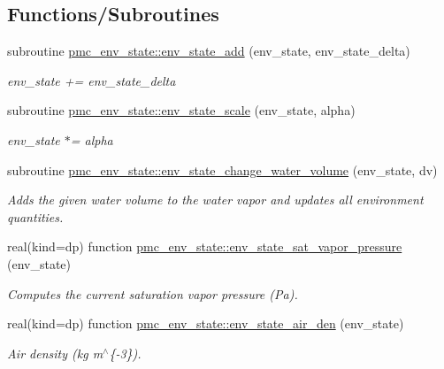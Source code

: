 \subsection*{Functions/\+Subroutines}
\begin{DoxyCompactItemize}
\item 
subroutine \mbox{\hyperlink{namespacepmc__env__state_a8a28c313cebdbb76a6bf2fb278a8addf}{pmc\+\_\+env\+\_\+state\+::env\+\_\+state\+\_\+add}} (env\+\_\+state, env\+\_\+state\+\_\+delta)
\begin{DoxyCompactList}\small\item\em env\+\_\+state += env\+\_\+state\+\_\+delta \end{DoxyCompactList}\item 
subroutine \mbox{\hyperlink{namespacepmc__env__state_a2fe48038c4d8f58d369fb68e2e94ed49}{pmc\+\_\+env\+\_\+state\+::env\+\_\+state\+\_\+scale}} (env\+\_\+state, alpha)
\begin{DoxyCompactList}\small\item\em env\+\_\+state $\ast$= alpha \end{DoxyCompactList}\item 
subroutine \mbox{\hyperlink{namespacepmc__env__state_a961f64db61820e148e7a85f93755180b}{pmc\+\_\+env\+\_\+state\+::env\+\_\+state\+\_\+change\+\_\+water\+\_\+volume}} (env\+\_\+state, dv)
\begin{DoxyCompactList}\small\item\em Adds the given water volume to the water vapor and updates all environment quantities. \end{DoxyCompactList}\item 
real(kind=dp) function \mbox{\hyperlink{namespacepmc__env__state_abc5a1b93ea4a56a1b20c4fc3177b2ab4}{pmc\+\_\+env\+\_\+state\+::env\+\_\+state\+\_\+sat\+\_\+vapor\+\_\+pressure}} (env\+\_\+state)
\begin{DoxyCompactList}\small\item\em Computes the current saturation vapor pressure (Pa). \end{DoxyCompactList}\item 
real(kind=dp) function \mbox{\hyperlink{namespacepmc__env__state_a9ff224fb49c16b4bfe0ae896d9c278f2}{pmc\+\_\+env\+\_\+state\+::env\+\_\+state\+\_\+air\+\_\+den}} (env\+\_\+state)
\begin{DoxyCompactList}\small\item\em Air density (kg m$^\wedge$\{-\/3\}). \end{DoxyCompactList}\item 

\end{DoxyCompactItemize}
